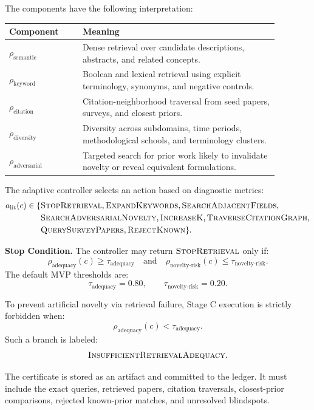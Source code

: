 \documentclass[11pt]{article}
\begin{document}
The components have the following interpretation:
\begin{center}
\begin{tabular}{p{0.24\linewidth} p{0.64\linewidth}}
\toprule
Component & Meaning \\
\midrule
$\rho_{\text{semantic}}$ & Dense retrieval over candidate descriptions, abstracts, and related concepts. \\
$\rho_{\text{keyword}}$ & Boolean and lexical retrieval using explicit terminology, synonyms, and negative controls. \\
$\rho_{\text{citation}}$ & Citation-neighborhood traversal from seed papers, surveys, and closest priors. \\
$\rho_{\text{diversity}}$ & Diversity across subdomains, time periods, methodological schools, and terminology clusters. \\
$\rho_{\text{adversarial}}$ & Targeted search for prior work likely to invalidate novelty or reveal equivalent formulations. \\
\bottomrule
\end{tabular}
\end{center}

The adaptive controller selects an action based on diagnostic metrics:
$$
\begin{aligned}
a_{\text{lit}}(c) \in \{ & \textsc{StopRetrieval}, \textsc{ExpandKeywords}, \textsc{SearchAdjacentFields}, \\
& \textsc{SearchAdversarialNovelty}, \textsc{IncreaseK}, \textsc{TraverseCitationGraph}, \\
& \textsc{QuerySurveyPapers}, \textsc{RejectKnown} \}.
\end{aligned}
$$

\textbf{Stop Condition.} The controller may return $\textsc{StopRetrieval}$ only if:
$$
\rho_{\text{adequacy}}(c)\geq \tau_{\text{adequacy}}
\quad \text{and} \quad
\rho_{\text{novelty-risk}}(c)\leq \tau_{\text{novelty-risk}}.
$$
The default MVP thresholds are:
$$
\tau_{\text{adequacy}}=0.80,
\qquad
\tau_{\text{novelty-risk}}=0.20.
$$

To prevent artificial novelty via retrieval failure, Stage C execution is strictly forbidden when:
$$
\rho_{\text{adequacy}}(c)<\tau_{\text{adequacy}}.
$$
Such a branch is labeled:
$$
\textsc{InsufficientRetrievalAdequacy}.
$$

The certificate is stored as an artifact and committed to the ledger. It must include the exact queries, retrieved papers, citation traversals, closest-prior comparisons, rejected known-prior matches, and unresolved blindspots.
\end{document}
